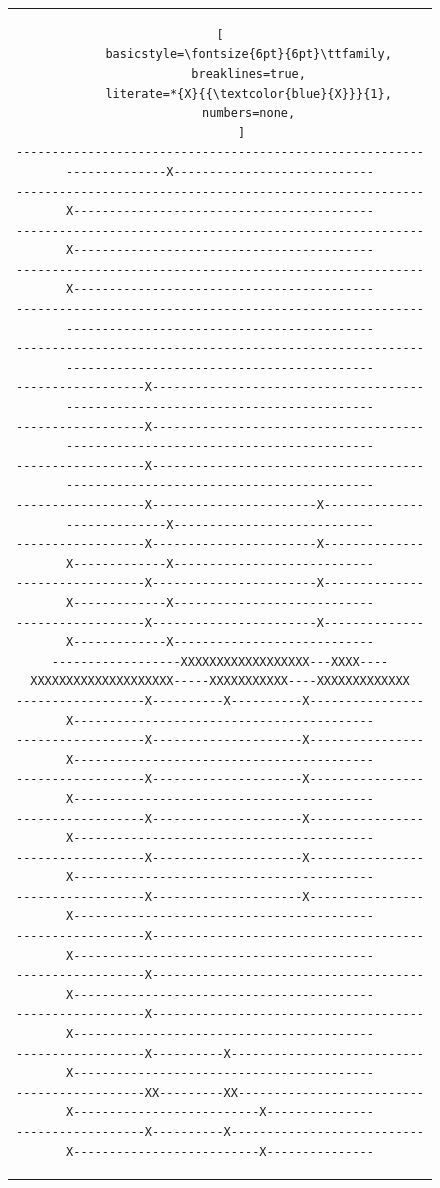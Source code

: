 \documentclass[12pt,a4paper]{article}
\begin{document}
\begin{figure}[H]
\begin{tabular}{c}
\begin{lstlisting}[
        basicstyle=\fontsize{6pt}{6pt}\ttfamily,
        breaklines=true,
        literate=*{X}{{\textcolor{blue}{X}}}{1},
        numbers=none,
      ]
-----------------------------------------------------------------------X----------------------------
---------------------------------------------------------X------------------------------------------
---------------------------------------------------------X------------------------------------------
---------------------------------------------------------X------------------------------------------
----------------------------------------------------------------------------------------------------
----------------------------------------------------------------------------------------------------
------------------X---------------------------------------------------------------------------------
------------------X---------------------------------------------------------------------------------
------------------X---------------------------------------------------------------------------------
------------------X-----------------------X----------------------------X----------------------------
------------------X-----------------------X--------------X-------------X----------------------------
------------------X-----------------------X--------------X-------------X----------------------------
------------------X-----------------------X--------------X-------------X----------------------------
------------------XXXXXXXXXXXXXXXXXX---XXXX----XXXXXXXXXXXXXXXXXXXX-----XXXXXXXXXXX----XXXXXXXXXXXXX
------------------X----------X----------X----------------X------------------------------------------
------------------X---------------------X----------------X------------------------------------------
------------------X---------------------X----------------X------------------------------------------
------------------X---------------------X----------------X------------------------------------------
------------------X---------------------X----------------X------------------------------------------
------------------X---------------------X----------------X------------------------------------------
------------------X--------------------------------------X------------------------------------------
------------------X--------------------------------------X------------------------------------------
------------------X--------------------------------------X------------------------------------------
------------------X----------X---------------------------X------------------------------------------
------------------XX---------XX--------------------------X--------------------------X---------------
------------------X----------X---------------------------X--------------------------X---------------

\end{lstlisting}
\end{tabular}
\end{figure}
\end{document}
